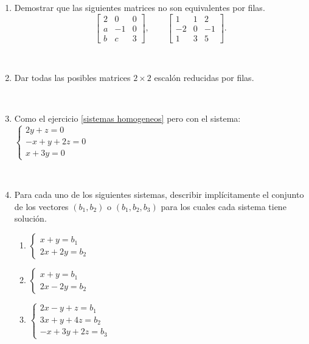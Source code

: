 \documentclass[12pt]{amsart}
\begin{document}
\begin{enumerate}[resume]
\

\item Demostrar que las siguientes matrices no son equivalentes por filas.
 $$\begin{bmatrix}2 & 0 & 0 \\a & -1 & 0 \\ b&c&3\end{bmatrix}, \qquad  \begin{bmatrix}1 & 1 & 2 \\-2 & 0 & -1 \\1&3&5\end{bmatrix}.$$

\

\item Dar todas las posibles matrices $2\times2$ escal\'on reducidas por filas.

\

\item Como el ejercicio \eqref{sistemas homogeneos} pero con el sistema:
$\begin{cases}
 2y  + z = 0\\
 -x+ y+2z = 0\\
x + 3y  = 0
\end{cases}$

\

\item\label{sistemas con soluciones} Para cada uno de los siguientes sistemas, describir impl\'icitamente el conjunto de los vectores $(b_1,b_2)$
o $(b_1,b_2,b_3)$ para los cuales cada sistema tiene soluci\'on.

\begin{multicols}{3}
\begin{enumerate}
\item  $\left\{\begin{array}{l}x+y=b_1\\ 2x+2y=b_2\end{array}\right.$
\item  $\left\{\begin{array}{l}x+y=b_1\\ 2x-2y=b_2\end{array}\right.$
\item  $\left\{\begin{array}{l}2x-y+z = b_1 \\ 3x +y +4z = b_2 \\ -x +3y + 2z = b_3\end{array}\right.$
\end{enumerate}
\end{multicols}


\end{enumerate}
\end{document}
